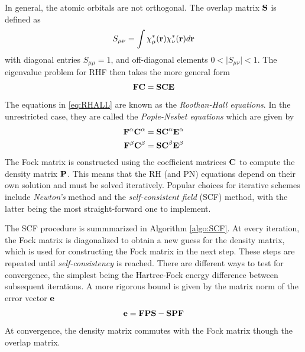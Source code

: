In general, the atomic orbitals are not orthogonal. The overlap matrix $\mathbf{S}$ is defined as 
\begin{equation}
S_{\mu\nu} = \int \chi_{\mu}^*(\mathbf{r}) \chi_{\nu}^*(\mathbf{r}) d\mathbf{r}
\end{equation}
\noindent with diagonal entries $S_{\mu\mu} = 1$, and off-diagonal elements $0 < \mid S_{\mu\nu} \mid < 1$. The eigenvalue problem for RHF then takes the more general form
\begin{equation}
\mathbf{F} \mathbf{C} = \mathbf{SC} \mathbf{E}
\label{eq:RHALL}
\end{equation}
\noindent The equations in \ref{eq:RHALL} are known as the \emph{Roothan-Hall equations}. In the unrestricted case, they are called the \emph{Pople-Nesbet equations} which are given by
\begin{align}
\mathbf{F}^{\alpha} \mathbf{C}^{\alpha} &= \mathbf{SC}^{\alpha} \mathbf{E}^{\alpha} \\
\mathbf{F}^{\beta} \mathbf{C}^{\beta} &= \mathbf{SC}^{\beta} \mathbf{E}^{\beta}
\end{align}  
\noindent The Fock matrix is constructed using the coefficient matrices $\mathbf{C}$ to compute the density matrix $\mathbf{P}$. This means that the RH (and PN) equations depend on their own solution and must be solved iteratively. Popular choices for iterative schemes include \emph{Newton's} method and the \emph{self-consistent field} (SCF) method, with the latter being the most straight-forward one to implement. 

The SCF procedure is summmarized in Algorithm \ref{algo:SCF}. At every iteration, the Fock matrix is diagonalized to obtain a new guess for the density matrix, which is used for constructing the Fock matrix in the next step. These steps are repeated until \emph{self-consistency} is reached. There are different ways to test for convergence, the simplest being the Hartree-Fock energy difference between subsequent iterations. A more rigorous bound is given by the matrix norm of the error vector $\mathbf{e}$
\begin{equation}
\mathbf{e} = \mathbf{FPS} - \mathbf{SPF} 
\end{equation}
\noindent At convergence, the density matrix commutes with the Fock matrix though the overlap matrix. 

